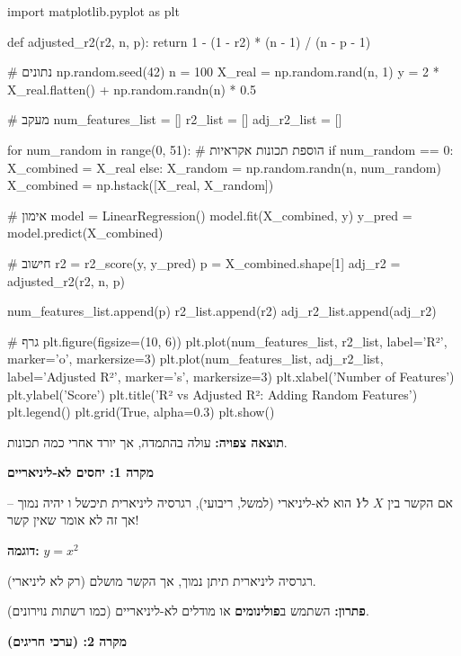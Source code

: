 \begin{pythonbox}
import matplotlib.pyplot as plt

def adjusted_r2(r2, n, p):
    return 1 - (1 - r2) * (n - 1) / (n - p - 1)

# נתונים
np.random.seed(42)
n = 100
X_real = np.random.rand(n, 1)
y = 2 * X_real.flatten() + np.random.randn(n) * 0.5

# מעקב
num_features_list = []
r2_list = []
adj_r2_list = []

for num_random in range(0, 51):
    # הוספת תכונות אקראיות
    if num_random == 0:
        X_combined = X_real
    else:
        X_random = np.random.randn(n, num_random)
        X_combined = np.hstack([X_real, X_random])
    
    # אימון
    model = LinearRegression()
    model.fit(X_combined, y)
    y_pred = model.predict(X_combined)
    
    # חישוב
    r2 = r2_score(y, y_pred)
    p = X_combined.shape[1]
    adj_r2 = adjusted_r2(r2, n, p)
    
    num_features_list.append(p)
    r2_list.append(r2)
    adj_r2_list.append(adj_r2)

# גרף
plt.figure(figsize=(10, 6))
plt.plot(num_features_list, r2_list, label='R²', marker='o', markersize=3)
plt.plot(num_features_list, adj_r2_list, label='Adjusted R²', marker='s', markersize=3)
plt.xlabel('Number of Features')
plt.ylabel('Score')
plt.title('R² vs Adjusted R²: Adding Random Features')
plt.legend()
plt.grid(True, alpha=0.3)
plt.show()
\end{pythonbox}

\textbf{תוצאה צפויה:} \Rsquared{} עולה בהתמדה, אך  יורד אחרי כמה תכונות.


\textbf{מקרה \num{1}: יחסים לא-ליניאריים}

אם הקשר בין $X$ ל\en{-}$Y$ הוא לא-ליניארי (למשל, ריבועי), רגרסיה ליניארית תיכשל ו\en{-}\Rsquared{} יהיה נמוך – אך זה לא אומר שאין קשר!

\textbf{דוגמה:} $y = x^2$

רגרסיה ליניארית תיתן \Rsquared{} נמוך, אך הקשר מושלם (רק לא ליניארי).

\textbf{פתרון:} השתמש ב\textbf{פולינומים} או מודלים לא-ליניאריים (כמו רשתות נוירונים).

\textbf{מקרה \num{2}:  (ערכי חריגים)}

